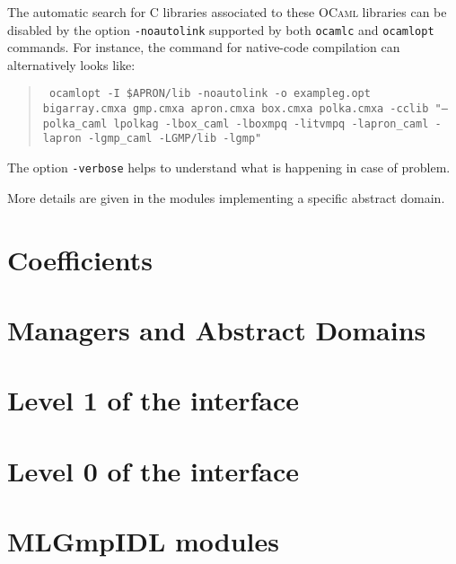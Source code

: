 \documentclass[twoside,10pt,a4paper]{report}
\begin{document}
The automatic search for C libraries associated to these
\textsc{OCaml} libraries can be disabled by the option
\texttt{-noautolink} supported by both \texttt{ocamlc} and
\texttt{ocamlopt} commands. For instance, the command for native-code compilation can alternatively looks like:
\begin{quote}\tt
  ocamlopt -I \$APRON/lib -noautolink -o exampleg.opt bigarray.cmxa gmp.cmxa apron.cmxa box.cmxa polka.cmxa -cclib "--polka\_caml lpolkag -lbox\_caml -lboxmpq -litvmpq -lapron\_caml -lapron -lgmp\_caml -LGMP/lib -lgmp"
\end{quote}

The option \texttt{-verbose} helps to understand what is happening
in case of problem.

More details are given in the modules implementing a specific
abstract domain.

\part{Coefficients}




\part{Managers and Abstract Domains}






\part{Level 1 of the interface}








\part{Level 0 of the interface}






\part{MLGmpIDL modules}








\appendix
\printindex
\end{document}
